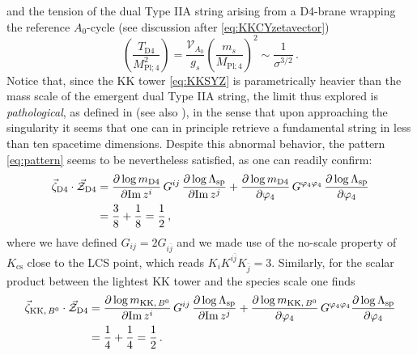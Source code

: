 %
and the tension of the dual Type IIA string arising from a D4-brane wrapping the reference $A_0$-cycle (see discussion after \eqref{eq:KKCYzetavector})
%
\begin{equation}\label{eq:D4SYZ}
	\left(\frac{T_{\text{D4}}}{M_{\text{Pl;}\, 4}^2} \right)= \frac{\mathcal{V}_{A_0}}{g_s} \left(\frac{m_s}{M_{\text{Pl;}\, 4}} \right)^2 \sim \frac{1}{\sigma^{3/2}}\, .
\end{equation}
%
Notice that, since the KK tower \eqref{eq:KKSYZ} is parametrically heavier than the mass scale of the emergent dual Type IIA string, the limit thus explored is \emph{pathological}, as defined in \cite{Lee:2019wij} (see also \cite{Baume:2019sry, Alvarez-Garcia:2021pxo}), in the sense that upon approaching the singularity it seems that one can in principle retrieve a fundamental string in less than ten spacetime dimensions. Despite this abnormal behavior, the pattern \eqref{eq:pattern} seems to be nevertheless satisfied, as one can readily confirm:%
%
\begin{align}\label{eq:patternviolation}
	\vec{\zeta}_{\rm{D4}} \cdot \vec{\mathcal{Z}}_{\text{D4}} &= \frac{\partial \log m_{\rm{D4}}}{\partial \text{Im}\, z^i}\, G^{ij}\, \frac{\partial \log \Lambda_{\text{sp}}}{\partial \text{Im}\, z^j} + \frac{\partial \log m_{\rm{D4}}}{\partial \varphi_4}\, G^{\varphi_4 \varphi_4}\, \frac{\partial \log \Lambda_{\text{sp}}}{\partial \varphi_4}\notag\\
	&=\frac{3}{8}+\frac{1}{8}=\frac{1}{2}\, ,
\end{align}
%
where we have defined $G_{i j} =2 G_{i \bar j}$ and we made use of the no-scale property of $K_{\text{cs}}$ close to the LCS point, which reads $K_i K^{i \bar j} K_{\bar j} = 3$. Similarly, for the scalar product between the lightest KK tower and the species scale one finds
%
\begin{align}\label{eq:patternviolationII}
	\vec{\zeta}_{\text{KK},\, B^0} \cdot \vec{\mathcal{Z}}_{\text{D4}} &= \frac{\partial \log m_{\text{KK},\, B^0}}{\partial \text{Im}\, z^i}\, G^{ij}\, \frac{\partial \log \Lambda_{\text{sp}}}{\partial \text{Im}\, z^j} + \frac{\partial \log m_{\text{KK},\, B^0}}{\partial \varphi_4}\, G^{\varphi_4 \varphi_4} \frac{\partial \log \Lambda_{\text{sp}}}{\partial \varphi_4}\notag\\
	&=\frac{1}{4}+\frac{1}{4}=\frac{1}{2}\, .
\end{align}
